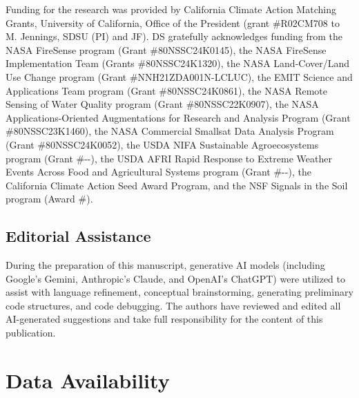 \documentclass[12pt]{report}
\begin{document}
Funding for the research was provided by California Climate Action Matching Grants, University of California, Office of the President (grant \#R02CM708 to M. Jennings, SDSU (PI) and JF). DS gratefully acknowledges funding from the NASA FireSense program (Grant \#\allowbreak 80NSSC24K0145), the NASA FireSense Implementation Team (Grants \#\allowbreak 80NSSC24K1320), the NASA Land-Cover/Land Use Change program (Grant \#\allowbreak NNH21ZDA001N-\allowbreak LCLUC), the EMIT Science and Applications Team program (Grant \#\allowbreak 80NSSC24K0861), the NASA Remote Sensing of Water Quality program (Grant \#\allowbreak 80NSSC22K0907), the NASA Applications-Oriented Augmentations for Research and Analysis Program (Grant \#\allowbreak 80NSSC23K1460), the NASA Commercial Smallsat Data Analysis Program (Grant \#\allowbreak 80NSSC24K0052), the USDA NIFA Sustainable Agroecosystems program (Grant \#--), the USDA AFRI Rapid Response to Extreme Weather Events Across Food and Agricultural Systems program (Grant \#--), the California Climate Action Seed Award Program, and the NSF Signals in the Soil program (Award \#).

\section*{Editorial Assistance}

During the preparation of this manuscript, generative AI models (including Google's Gemini, Anthropic's Claude, and OpenAI's ChatGPT) were utilized to assist with language refinement, conceptual brainstorming, generating preliminary code structures, and code debugging. The authors have reviewed and edited all AI-generated suggestions and take full responsibility for the content of this publication.

\chapter*{Data Availability}
\end{document}
